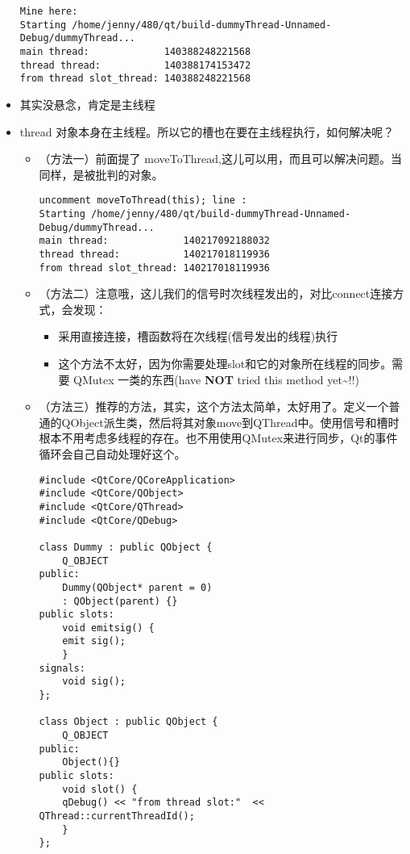 \documentclass[9pt,b5paper]{article}
\begin{document}
\begin{itemize}
\begin{lstlisting}
Mine here: 
Starting /home/jenny/480/qt/build-dummyThread-Unnamed-Debug/dummyThread...
main thread:             140388248221568 
thread thread:           140388174153472 
from thread slot_thread: 140388248221568
\end{lstlisting}
\item 其实没悬念，肯定是主线程
\item thread 对象本身在主线程。所以它的槽也在要在主线程执行，如何解决呢？
\begin{itemize}
\item （方法一）前面提了 moveToThread,这儿可以用，而且可以解决问题。当同样，是被批判的对象。
\lstset{language=java,label= ,caption= ,numbers=none}
\begin{lstlisting}
uncomment moveToThread(this); line :
Starting /home/jenny/480/qt/build-dummyThread-Unnamed-Debug/dummyThread...
main thread:             140217092188032 
thread thread:           140217018119936 
from thread slot_thread: 140217018119936
\end{lstlisting}
\item （方法二）注意哦，这儿我们的信号时次线程发出的，对比connect连接方式，会发现：
\begin{itemize}
\item 采用直接连接，槽函数将在次线程(信号发出的线程)执行
\item 这个方法不太好，因为你需要处理slot和它的对象所在线程的同步。需要 QMutex 一类的东西(have \textbf{NOT} tried this method yet\textasciitilde{}!!)
\end{itemize}
\item （方法三）推荐的方法，其实，这个方法太简单，太好用了。定义一个普通的QObject派生类，然后将其对象move到QThread中。使用信号和槽时根本不用考虑多线程的存在。也不用使用QMutex来进行同步，Qt的事件循环会自己自动处理好这个。
\lstset{language=java,label= ,caption= ,numbers=none}
\begin{lstlisting}
#include <QtCore/QCoreApplication>   
#include <QtCore/QObject>   
#include <QtCore/QThread>   
#include <QtCore/QDebug>    

class Dummy : public QObject {       
    Q_OBJECT   
public:
    Dummy(QObject* parent = 0)
	: QObject(parent) {}   
public slots:
    void emitsig() {
	emit sig();       
    }
signals:
    void sig();
};

class Object : public QObject {       
    Q_OBJECT   
public:
    Object(){}
public slots:
    void slot() {    
	qDebug() << "from thread slot:"  << QThread::currentThreadId();       
    }   
};    


\end{lstlisting}
\end{itemize}
\end{itemize}
\end{document}
